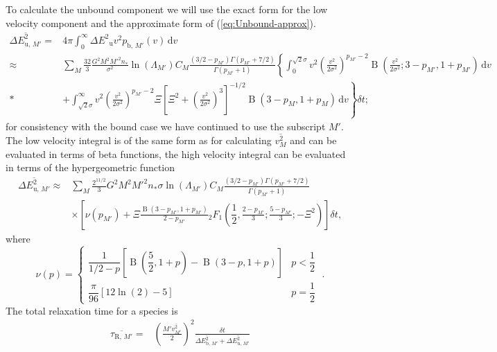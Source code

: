 \documentclass[useAMS,usedcolumn,usegraphicx,usenatbib]{mn2e}
\newcommand{\eqnref}[1]{(\ref{eq:#1})}
\DeclareMathOperator{\Beta}{B}
\newcommand{\sub}[1]{\ensuremath{_\mathrm{#1}}}
\newcommand{\dd}{\ensuremath{\mathrm{d}}}
\newcommand{\intd}[4]{\ensuremath{\displaystyle \int_{#1}^{#2}{#3}\,\dd{#4}}}
\newcommand{\recip}[1]{\ensuremath{\dfrac{1}{#1}}}
\begin{document}
\begin{onecolumn}
To calculate the unbound component we will use the exact form for the low velocity component and the approximate form of \eqnref{Unbound-approx}. 
\begin{align}
\overline{\Delta E^2_{\mathrm{u},\,M'}} = {} & 4\pi\intd{0}{\infty}{\Delta E^2\sub{u} v^2 p_{\mathrm{b},\,M'}(v)}{v} \\
 \approx {} & \sum_M\frac{32}{3}\frac{G^2M^2{M'}^2n_\ast}{\sigma^2}\ln\left(\Lambda_{M'}\right) C_M \frac{(3/2 - p_{M'})\Gamma(p_{M'} + 7/2)}{\Gamma(p_{M'} + 1)} \left\{ \intd{0}{\sqrt{2}\sigma}{v^2\left(\frac{v^2}{2\sigma^2}\right)^{p_{M'}-2}\Beta\left(\frac{v^2}{2\sigma^2};3-p_{M'},1+p_{M'}\right)}{v} \right. \nonumber \\* 
 {} & + \left. \intd{\sqrt{2}\sigma}{\infty}{v^2\left(\frac{v^2}{2\sigma^2}\right)^{p_{M'}-2} \Xi\left[\Xi^2 + \left(\frac{v^2}{2\sigma^2}\right)^3\right]^{-1/2} \Beta\left(3-p_M,1+p_M\right)}{v} \right\} \delta t;
\end{align}
for consistency with the bound case we have continued to use the subscript $M'$. The low velocity integral is of the same form as for calculating $\overline{v^2_M}$ and can be evaluated in terms of beta functions, the high velocity integral can be evaluated in terms of the hypergeometric function \citep[15.6.1]{Olver2010}
\begin{align}
\overline{\Delta E^2_{\mathrm{u},\,M'}} \approx {} & \sum_M\frac{2^{11/2}}{3}G^2M^2{M'}^2n_\ast\sigma\ln\left(\Lambda_{M'}\right) C_M \frac{(3/2 - p_{M'})\Gamma(p_{M'} + 7/2)}{\Gamma(p_{M'} + 1)} \nonumber \\
  & \times \left[\nu\left(p_{M'}\right) + \Xi\frac{\Beta\left(3-p_{M'},1+p_{M'}\right)}{2-p_{M'}}{_2F_1}\left(\recip{2},\frac{2-p_{M'}}{3};\frac{5-p_{M'}}{3};-\Xi^2\right) \right] \delta t,
\end{align}
where
\begin{equation}
\nu(p) = \begin{cases} \recip{1/2 - p}\left[\Beta\left(\dfrac{5}{2},1+p\right) - \Beta\left(3-p,1+p\right)\right] & p < \recip{2} \\
\dfrac{\pi}{96}\left[12 \ln(2) - 5\right] & p = \recip{2}
\end{cases} \; .
\end{equation}
The total relaxation time for a species is
\begin{align}
\overline{\tau_{\mathrm{R,}\,M'}} = {} & \left(\frac{{M'}\overline{v_{M'}^2}}{2}\right)^2\frac{\delta t}{\overline{\Delta E^2_{\mathrm{b},\,M'}} + \overline{\Delta E^2_{\mathrm{u},\,M'}}} \\

\end{align}
\end{onecolumn}
\end{document}

